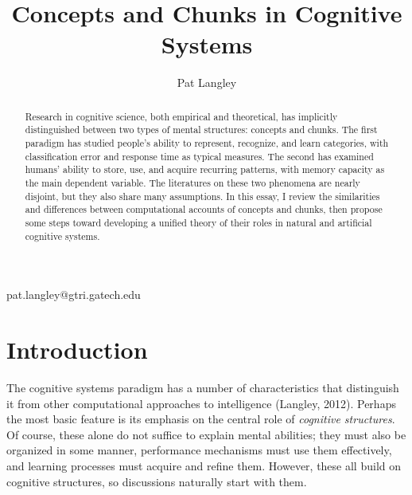 \documentclass[11pt,letterpaper]{article}
\begin{document}
 

\title{Concepts and Chunks in Cognitive Systems} 
 
\author{Pat Langley}{pat.langley@gtri.gatech.edu}
\address{Information and Communications Laboratory, Georgia Tech 
         Research Institute, Atlanta, GA 30318} 
\vskip -0.13in
\address{Institute for the Study of Learning and Expertise,
         2164 Staunton Court, Palo Alto, CA 94306}
\vskip 0.2in

\begin{abstract}
Research in cognitive science, both empirical and theoretical, has
implicitly distinguished between two types of mental structures:
concepts and chunks. The first paradigm has studied people's ability
to represent, recognize, and learn categories, with classification error
and response time as typical measures. The second has examined humans' 
ability to store, use, and acquire recurring patterns, with memory
capacity as the main dependent variable. The literatures on these two
phenomena are nearly disjoint, but they also share many assumptions.
In this essay, I review the similarities and differences between
computational accounts of concepts and chunks, then propose some
steps toward developing a unified theory of their roles in natural
and artificial cognitive systems.
\end{abstract}  

\vspace{0.1in}
\section{Introduction} 


The cognitive systems paradigm has a number of characteristics that
distinguish it from other computational approaches to intelligence
(Langley, 2012). Perhaps the most basic feature is its emphasis on
the central role of {\it cognitive structures\/}. Of course, these
alone do not suffice to explain mental abilities; they must also be
organized in some manner, performance mechanisms must use them 
effectively, and learning processes must acquire and refine them. 
However, these all build on cognitive structures, so discussions
naturally start with them. 

\end{document}
